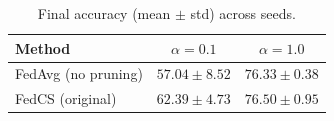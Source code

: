 \begin{table}[htbp]
\centering
\caption{Final accuracy (mean $\pm$ std) across seeds.}
\label{tab:results}
\begin{tabular}{lcc}
\toprule
Method & $\alpha = 0.1$ & $\alpha = 1.0$ \\
\midrule
FedAvg (no pruning) & $57.04 \pm 8.52$ & $76.33 \pm 0.38$ \\
FedCS (original) & $62.39 \pm 4.73$ & $76.50 \pm 0.95$ \\
\bottomrule
\end{tabular}
\end{table}